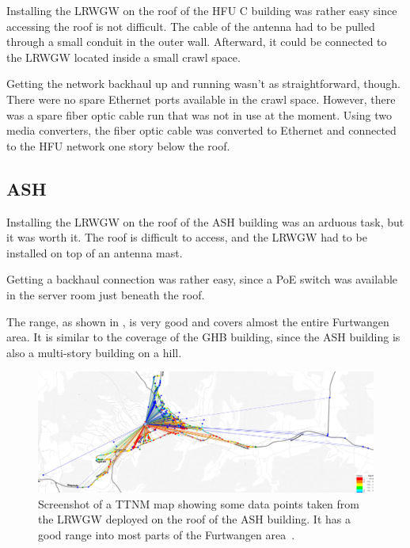 Installing the \acl{LRWGW} on the roof of the \ac{HFU} C building was rather easy since accessing the roof is not difficult.
The cable of the antenna had to be pulled through a small conduit in the outer wall.
Afterward, it could be connected to the \acl{LRWGW} located inside a small crawl space.

Getting the network backhaul up and running wasn't as straightforward, though.
There were no spare Ethernet ports available in the crawl space.
However, there was a spare fiber optic cable run that was not in use at the moment.
Using two media converters, the fiber optic cable was converted to Ethernet and connected to the \ac{HFU} network one story below the roof.

\subsection{\acl{ASH}}

Installing the \acl{LRWGW} on the roof of the \ac{ASH} building was an arduous task, but it was worth it.
The roof is difficult to access, and the \acl{LRWGW} had to be installed on top of an antenna mast.

Getting a backhaul connection was rather easy, since a \ac{PoE} switch was available in the server room just beneath the roof.

The range, as shown in , is very good and covers almost the entire Furtwangen area.
It is similar to the coverage of the \ac{GHB} building, since the \ac{ASH} building is also a multi-story building on a hill.

\begin{figure}[htbp]
    \centering
    \includegraphics[width=1\textwidth]{pictures/ttn-mapper/gateway-ranges/ash_gw_range.jpg}
    \caption[Screenshot of a \acl{TTNM} map showing some data points taken from the \acl{LRWGW} deployed on the roof of the \acl{ASH} building]{
        Screenshot of a \ac{TTNM} map showing some data points taken from the \acl{LRWGW} deployed on the roof of the \ac{ASH} building.
        It has a good range into most parts of the Furtwangen area~\cite{ttn_mapper_ttn_2023}.
    }\label{pic:ash_gw_range}
\end{figure}

